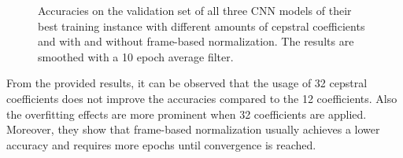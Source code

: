 \begin{figure}[!ht]
  \centering
  \quad
  \caption{Accuracies on the validation set of all three CNN models of their best training instance with different amounts of cepstral coefficients and with and without frame-based normalization. The results are smoothed with a 10 epoch average filter.}
  \label{fig:exp_fs_cepstral_acc}
\end{figure}
\FloatBarrier
\noindent
From the provided results, it can be observed that the usage of 32 cepstral coefficients does not improve the accuracies compared to the 12 coefficients.
Also the overfitting effects are more prominent when 32 coefficients are applied.
Moreover, they show that frame-based normalization usually achieves a lower accuracy and requires more epochs until convergence is reached.

